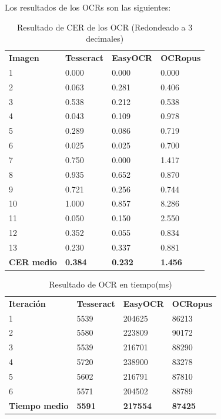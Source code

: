 Los resultados de los OCRs son las siguientes:
\begin{table}[H]
	\centering
	\caption{Resultado de CER de los OCR (Redondeado a 3 decimales)}
	\begin{tabular}{llll}
		\textbf{Imagen} & \textbf{Tesseract} & \textbf{EasyOCR} &\textbf{OCRopus} \\
		1  & 0.000 & 0.000 & 0.000 \\
		2  & 0.063 & 0.281 & 0.406 \\
		3  & 0.538 & 0.212 & 0.538 \\
		4  & 0.043 & 0.109 & 0.978 \\
		5  & 0.289 & 0.086 & 0.719 \\
		6  & 0.025 & 0.025 & 0.700 \\
		7  & 0.750 & 0.000 & 1.417 \\
		8  & 0.935 & 0.652 & 0.870 \\
		9  & 0.721 & 0.256 & 0.744 \\
		10 & 1.000 & 0.857 & 8.286 \\
		11 & 0.050 & 0.150 & 2.550 \\
		12 & 0.352 & 0.055 & 0.834 \\
		13 & 0.230 & 0.337 & 0.881 \\
		\textbf{CER medio} & \textbf{0.384}& \textbf{0.232} & \textbf{1.456}\\
	\end{tabular}
	\label{table:OCRResult}
\end{table}
\begin{table}[H]
	\centering
	\caption{Resultado de OCR en tiempo(ms)}
	\begin{tabular}{llll}
		\textbf{Iteración} & \textbf{Tesseract}& \textbf{EasyOCR}& \textbf{OCRopus} \\
		1  & 5539   & 204625 & 86213  \\
		2  & 5580   & 223809 & 90172  \\
		3  & 5539   & 216701 & 88290  \\
		4  & 5720   & 238900 & 83278  \\
		5  & 5602   & 216791 & 87810  \\
		6  & 5571   & 204502 & 88789  \\
		\textbf{Tiempo medio} & \textbf{5591}&\textbf{217554}&\textbf{87425} \\
	\end{tabular}
	\label{table:OCRResultTime}
\end{table}


